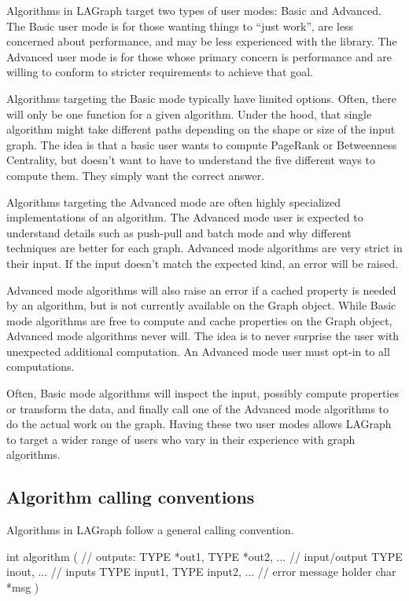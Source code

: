 Algorithms in LAGraph target two types of user modes: Basic and Advanced. The Basic user mode is for those wanting
things to ``just work'', are less concerned about performance, and may be less experienced with the library.
The Advanced user mode is for those whose primary concern is performance and are willing to conform to stricter
requirements to achieve that goal.

Algorithms targeting the Basic mode typically have limited options. Often, there will only be one function for
a given algorithm. Under the hood, that single algorithm might take different paths depending on the shape or
size of the input graph. The idea is that a basic user wants to compute PageRank or Betweenness Centrality,
but doesn't want to have to understand the five different ways to compute them. They simply want the correct answer.

Algorithms targeting the Advanced mode are often highly specialized implementations of an algorithm. The Advanced
mode user is expected to understand details such as push-pull and batch mode and why different techniques are
better for each graph. Advanced mode algorithms are very strict in their input. If the input doesn't match the
expected kind, an error will be raised.

Advanced mode algorithms will also raise an error if a cached property is needed by an algorithm, but is not
currently available on the Graph object. While Basic mode algorithms are free to compute and cache properties
on the Graph object, Advanced mode algorithms never will. The idea is to never surprise the user with unexpected
additional computation. An Advanced mode user must opt-in to all computations.

Often, Basic mode algorithms will inspect the input, possibly compute properties or transform the data,
and finally call one of the Advanced mode algorithms to do the actual work on the graph. Having these two user
modes allows LAGraph to target a wider range of users who vary in their experience with graph algorithms.


\subsection{Algorithm calling conventions}

Algorithms in LAGraph follow a general calling convention.

\begin{cplus}
int algorithm
(
    // outputs:
    TYPE *out1,
    TYPE *out2,
    ...
    // input/output
    TYPE inout,
    ...
    // inputs
    TYPE input1,
    TYPE input2,
    ...
    // error message holder
    char *msg
)
\end{cplus}


